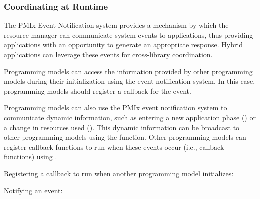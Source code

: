 \subsubsection{Coordinating at Runtime}

The PMIx Event Notification system provides a mechanism by which the resource manager can communicate system events to applications, thus providing applications with an opportunity to generate an appropriate response. Hybrid applications can leverage these events for cross-library coordination.

Programming models can access the information provided by other programming models during their initialization using the event notification system.  In this case, programming models should register a callback for the  event.

Programming models can also use the PMIx event notification system to communicate dynamic information, such as entering a new application phase () or a change in resources used ().  This dynamic information can be broadcast to other programming models using the  function.  Other programming models can register callback functions to run when these events occur (i.e., callback functions) using .


Registering a callback to run when another programming model initializes:
\pmixCodeJoinStart{}%
\pmixCodeJoin{}%
\pmixCodeJoinEnd{}%


Notifying an event:


{\large {}}

 \\
 \\
 \\
 \\

{\large {}}

